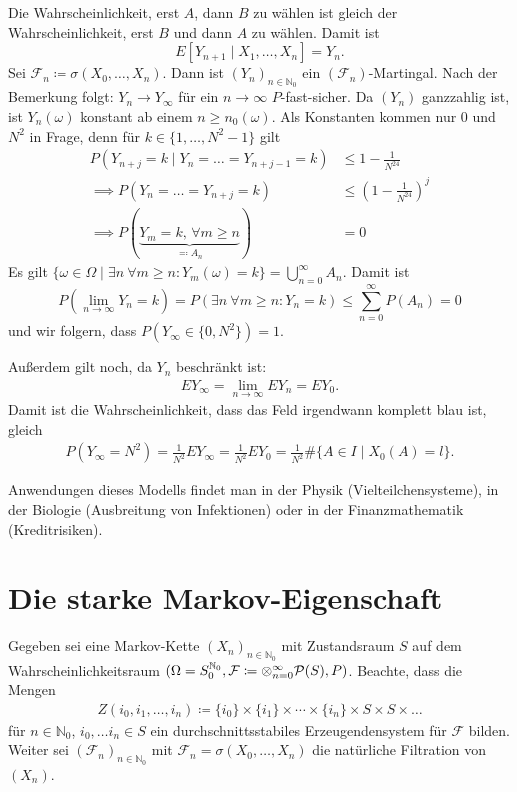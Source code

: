 \documentclass[a4paper,twoside,DIV15,BCOR12mm]{scrbook}
\newcommand{\cF}{\mathcal F}
\begin{document}
\begin{beispiel}
Die Wahrscheinlichkeit, erst $A$, dann $B$ zu wählen ist gleich der Wahrscheinlichkeit, erst $B$ und dann $A$ zu wählen. Damit ist
\[
E[Y_{n+1} \mid X_1,\ldots,X_n] = Y_n.
\]
Sei $\cF_n \coloneqq \sigma(X_0,\ldots,X_n)$. Dann ist $(Y_n)_{n\in\mathbb N_0}$ ein $(\cF_n)$-Martingal. Nach der Bemerkung folgt: $Y_n\to Y_\infty$ für ein $n\to\infty$ $P$-fast-sicher. Da $(Y_n)$ ganzzahlig ist, ist $Y_n(\omega)$ konstant ab einem $n\ge n_0(\omega)$. Als Konstanten kommen nur $0$ und $N^2$ in Frage, denn für $k\in \{1,\ldots,N^2-1\}$ gilt
\begin{align*}
P(Y_{n+j} = k \mid Y_n = \ldots = Y_{n+j-1} = k) &\le 1 - \frac1{N^24} \\
\implies P(Y_n = \ldots = Y_{n+j} = k) &\le (1-\frac1{N^24})^j \\
\implies P(\underbrace{Y_m = k,\, \forall m\ge n}_{\eqqcolon A_n}) &= 0
\end{align*}
Es gilt $\{\omega \in \Omega \mid \exists n\ \forall m\ge n: Y_m(\omega)=k\} = \bigcup_{n=0}^\infty A_n$. Damit ist \[
P(\lim_{n\to\infty} Y_n=k) = P(\exists n\ \forall m\ge n: Y_n=k) \le \sum_{n=0}^\infty P(A_n) =0
\]
und wir folgern, dass $P(Y_\infty \in \{0,N^2\}) = 1$.

Außerdem gilt noch, da $Y_n$ beschränkt ist:
\begin{align*}
EY_\infty = \lim_{n\to \infty} EY_n = EY_0.
\end{align*}
Damit ist die Wahrscheinlichkeit, dass das Feld irgendwann komplett blau ist, gleich 
\begin{align*}
P(Y_\infty =N^2)=\frac 1{N^2} EY_\infty = \frac 1{N^2}EY_0 = \frac1{N^2}\#\{A\in I\mid X_0(A)=l\}.
\end{align*}

Anwendungen dieses Modells findet man in der Physik (Vielteilchensysteme), in der Biologie (Ausbreitung von Infektionen) oder in der Finanzmathematik (Kreditrisiken).
\end{beispiel}

\section{Die starke Markov-Eigenschaft}

Gegeben sei eine Markov-Kette $(X_n)_{n\in\mathbb N_0}$ mit Zustandsraum $S$ auf dem Wahrscheinlichkeitsraum $(\Omega = S_0^{\mathbb N_0}, \cF\da \otimes_{n=0}^\infty \mathcal P(S), P)$. Beachte, dass die Mengen
\begin{align*}
Z(i_0,i_1,\ldots,i_n) \coloneqq \{i_0\} \times \{i_1\} \times \cdots \times \{i_n\} \times S \times S \times \dots
\end{align*}
für $n\in \mathbb N_0$, $i_0,\ldots i_n\in S$ ein durchschnittsstabiles Erzeugendensystem für $\cF$ bilden. Weiter sei $(\cF_n)_{n\in \mathbb N_0}$ mit $\cF_n=\sigma(X_0,\ldots,X_n)$ die natürliche Filtration von $(X_n)$.
\end{document}
